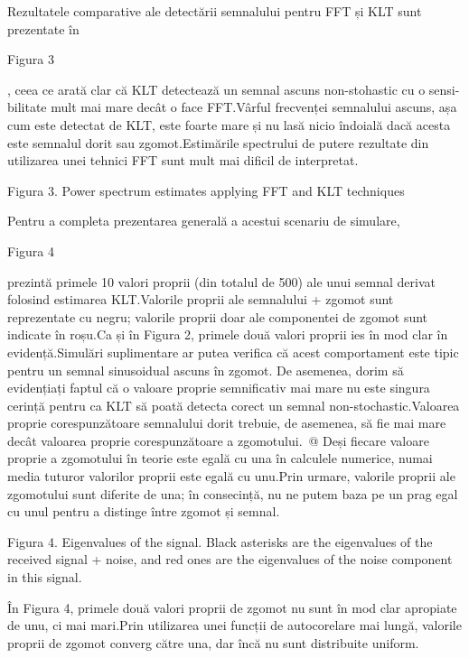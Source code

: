 \documentclass[12pt]{report}
\begin{document}
Rezultatele comparative ale detectării semnalului pentru FFT și KLT sunt prezentate în \begin{normalsize}\color{red}Figura 3\end{normalsize}, ceea ce arată clar că KLT detectează un semnal ascuns non-stohastic cu o sensi-bilitate mult mai mare decât o face FFT.\@ Vârful frecvenței semnalului ascuns, așa cum este detectat de KLT, este foarte mare și nu lasă nicio îndoială dacă acesta este semnalul dorit sau zgomot.\@ Estimările spectrului de putere rezultate din utilizarea unei tehnici FFT sunt mult mai dificil de interpretat.
\begin{center}
	\color{blue}Figura 3. Power spectrum estimates applying FFT and KLT techniques
\end{center}
Pentru a completa prezentarea generală a acestui scenariu de simulare, \begin{normalsize}\color{red}Figura 4\end{normalsize} prezintă primele 10 valori proprii (din totalul de 500) ale unui semnal derivat folosind estimarea KLT.\@ Valorile proprii ale semnalului + zgomot sunt reprezentate cu negru; valorile proprii doar ale componentei de zgomot sunt indicate în roșu.\@ Ca și în Figura 2, primele două valori proprii ies în mod clar în evidență.\@ Simulări suplimentare ar putea verifica că acest comportament este tipic pentru un semnal sinusoidual ascuns în zgomot. De asemenea, dorim să evidențiați faptul că o valoare proprie semnificativ mai mare nu este singura cerință pentru ca KLT să poată detecta corect un semnal non-stochastic.\@ Valoarea proprie corespunzătoare semnalului dorit trebuie, de asemenea, să fie mai mare decât valoarea proprie corespunzătoare a zgomotului.\ @ Deși fiecare valoare proprie a zgomotului în teorie este egală cu una în calculele numerice, numai media tuturor valorilor proprii este egală cu unu.\@ Prin urmare, valorile proprii ale zgomotului sunt diferite de una; în consecință, nu ne putem baza pe un prag egal cu unul pentru a distinge între zgomot și semnal.
\begin{center}
	\color{blue} Figura 4. Eigenvalues of the signal. Black asterisks are the eigenvalues of the received signal + noise, and red ones are the eigenvalues of the noise component in this signal.
\end{center}
În Figura 4, primele două valori proprii de zgomot nu sunt în mod clar apropiate de unu, ci mai mari.\@ Prin utilizarea unei funcții de autocorelare mai lungă, valorile proprii de zgomot converg către una, dar încă nu sunt distribuite uniform.
\end{document}

